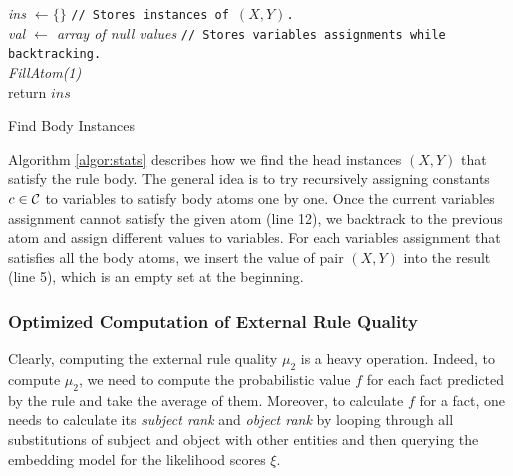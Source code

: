 \begin{algorithm}[t]
\DontPrintSemicolon
{}

\textit{ins $\leftarrow \{\}$} \texttt{// Stores instances of $(X,Y)$.}\\
\textit{val $\leftarrow$ array of null values} \texttt{// Stores variables assignments while backtracking.}\\
\textit{FillAtom(1)}\\
return $ins$

\caption{Find Body Instances}
\label{algor:stats}
\end{algorithm}

Algorithm \ref{algor:stats} describes how we find the head instances $(X,Y)$ that satisfy the rule body. The general idea is to try recursively assigning constants $c \in \mathcal{C}$ to variables to satisfy body atoms one by one. Once the current variables assignment cannot satisfy the given atom (line 12), we backtrack to the previous atom and assign different values to variables. For each variables assignment that satisfies all the body atoms, we insert the value of pair $(X,Y)$ into the result (line 5), which is an empty set at the beginning.

\subsubsection{Optimized Computation of External Rule Quality}
Clearly, computing the external rule quality $\mu_2$ is a heavy operation. Indeed, to compute $\mu_2$, we need to compute the probabilistic value $f$ for each fact predicted by the rule and take the average of them. Moreover, to calculate $f$ for a fact, one needs to calculate its \textit{subject rank}\cite{DBLP:journals/corr/abs-1301-3485} and \textit{object rank}\cite{DBLP:journals/corr/abs-1301-3485} by looping through all substitutions of subject and object with other entities and then querying the  embedding model for the likelihood scores $\xi$.

